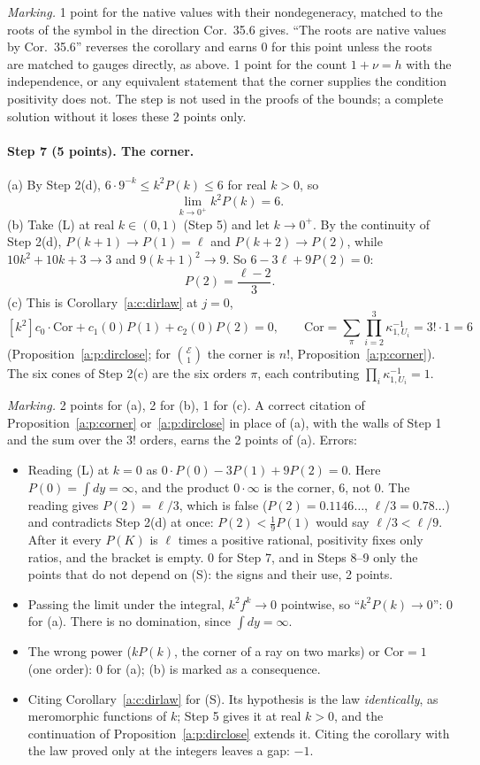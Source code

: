 \documentclass[11pt]{article}
\newcommand{\cE}{\mathcal E}
\theoremstyle{plain}
\theoremstyle{definition}
\theoremstyle{remark}
\begin{document}
\smallskip\noindent\emph{Marking.} 1 point for the native values with their nondegeneracy, matched to the roots of the symbol in the direction Cor.~35.6 gives. ``The roots are native values by Cor.~35.6'' reverses the corollary and earns 0 for this point unless the roots are matched to gauges directly, as above. 1 point for the count $1+\nu=h$ with the independence, or any equivalent statement that the corner supplies the condition positivity does not. The step is not used in the proofs of the bounds; a complete solution without it loses these 2 points only.

\paragraph{Step 7 (5 points). The corner.}
(a) By Step 2(d), $6\cdot9^{-k}\le k^2P(k)\le6$ for real $k>0$, so
\[
\lim_{k\to0^+}k^2P(k)=6 .
\]
(b) Take (L) at real $k\in(0,1)$ (Step 5) and let $k\to0^+$. By the continuity of Step 2(d), $P(k+1)\to P(1)=\ell$ and $P(k+2)\to P(2)$, while $10k^2+10k+3\to3$ and $9(k+1)^2\to9$. So $6-3\ell+9P(2)=0$:
\begin{equation}\tag{S}
P(2)=\frac{\ell-2}3 .
\end{equation}
(c) This is Corollary~\ref{a:c:dirlaw} at $j=0$,
\[
[k^2]c_0\cdot\mathrm{Cor}+c_1(0)P(1)+c_2(0)P(2)=0,\qquad \mathrm{Cor}=\sum_\pi\prod_{i=2}^3\kappa_{1,U_i}^{-1}=3!\cdot1=6
\]
(Proposition~\ref{a:p:dirclose}; for $\binom{\cE}1$ the corner is $n!$, Proposition~\ref{a:p:corner}). The six cones of Step 2(c) are the six orders $\pi$, each contributing $\prod_i\kappa_{1,U_i}^{-1}=1$.

\smallskip\noindent\emph{Marking.} 2 points for (a), 2 for (b), 1 for (c). A correct citation of Proposition~\ref{a:p:corner} or~\ref{a:p:dirclose} in place of (a), with the walls of Step 1 and the sum over the $3!$ orders, earns the 2 points of (a). Errors:
\begin{itemize}
\item Reading (L) at $k=0$ as $0\cdot P(0)-3P(1)+9P(2)=0$. Here $P(0)=\int dy=\infty$, and the product $0\cdot\infty$ is the corner, $6$, not $0$. The reading gives $P(2)=\ell/3$, which is false ($P(2)=0.1146\ldots$, $\ell/3=0.78\ldots$) and contradicts Step 2(d) at once: $P(2)<\frac19P(1)$ would say $\ell/3<\ell/9$. After it every $P(K)$ is $\ell$ times a positive rational, positivity fixes only ratios, and the bracket is empty. 0 for Step 7, and in Steps 8--9 only the points that do not depend on (S): the signs and their use, 2 points.
\item Passing the limit under the integral, $k^2f^k\to0$ pointwise, so ``$k^2P(k)\to0$'': 0 for (a). There is no domination, since $\int dy=\infty$.
\item The wrong power ($kP(k)$, the corner of a ray on two marks) or $\mathrm{Cor}=1$ (one order): 0 for (a); (b) is marked as a consequence.
\item Citing Corollary~\ref{a:c:dirlaw} for (S). Its hypothesis is the law \emph{identically}, as meromorphic functions of $k$; Step 5 gives it at real $k>0$, and the continuation of Proposition~\ref{a:p:dirclose} extends it. Citing the corollary with the law proved only at the integers leaves a gap: $-1$.
\end{itemize}
\end{document}
